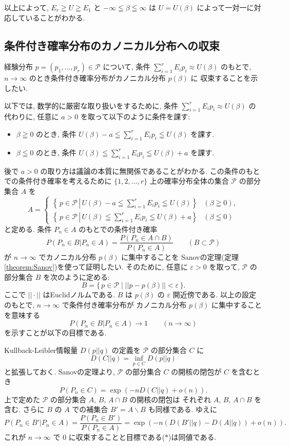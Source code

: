 \documentclass[12pt,twoside]{jarticle}
\newcommand\eps{\varepsilon}
\renewcommand\setminus{\smallsetminus}
\newcommand\cP{{\mathcal P}}
\theoremstyle{jplain}
\theoremstyle{jplain}
\theoremstyle{jplain}
\numberwithin{theorem}{section}
\numberwithin{equation}{section}
\numberwithin{figure}{section}
\numberwithin{table}{section}
\newcommand\theoremref[1]{定理\ref{#1}}
\begin{document}
以上によって, $E_r\geqq U\geqq E_1$ と $-\infty\leqq\beta\leqq\infty$
は $U=U(\beta)$ によって一対一に対応していることがわかる.


\subsection{条件付き確率分布のカノニカル分布への収束}

経験分布 $p=(p_1,\ldots,p_r)\in\cP$ について,
条件 $\sum_{i=1}^r E_i p_i\approx U(\beta)$ のもとで,
$n\to\infty$ のとき条件付き確率分布がカノニカル分布 $p(\beta)$ に
収束することを示したい.

以下では, 数学的に厳密な取り扱いをするために,
条件 $\sum_{i=1}^r E_i p_i\approx U(\beta)$ の代わりに,
任意に $a>0$ を取って以下のように条件を課す:
\begin{itemize}
\item $\beta\geqq 0$ のとき, 条件 \(
\displaystyle
U(\beta)-a \leqq \sum_{i=1}^r E_i p_i \leqq U(\beta)
\) を課す.
\item $\beta\leqq 0$ のとき, 条件 \(
\displaystyle
U(\beta)\leqq \sum_{i=1}^r E_i p_i \leqq U(\beta)+a
\) を課す.
\end{itemize}
後で $a>0$ の取り方は議論の本質に無関係であることがわかる.
この条件のもとでの条件付き確率を考えるために
$\{1,2,\ldots,r\}$ 上の確率分布全体の集合 $\cP$ の部分集合 $A$ を
\[
A =
\begin{cases}
\left\{\,p\in\cP \,\left|\,
U(\beta)-a \leqq \sum_{i=1}^r E_i p_i \leqq U(\beta) \right.\right\}
& (\beta\geqq 0),
\\
\left\{\, p\in\cP \,\left|\,
U(\beta)\leqq \sum_{i=1}^r E_i p_i \leqq U(\beta)+a \right.\right\}
& (\beta\leqq 0)
\end{cases}
\]
と定める. 条件 $P_n\in A$ のもとでの条件付き確率
\[
P(P_n\in B|P_n\in A)=\frac{P(P_n\in A\cap B)}{P(P_n\in A)}
\qquad (B\subset\cP)
\]
が $n\to\infty$ でカノニカル分布 $p(\beta)$ に集中することを
Sanovの定理(\theoremref{theorem:Sanov})を使って証明したい.
そのために, 任意に $\eps>0$ を取って,
$\cP$ の部分集合 $B$ を次のように定める:
\[
B = \{\,p\in\cP \mid ||p-p(\beta)||<\eps \,\}.
\]
ここで $||\cdot||$ はEuclidノルムである.
$B$ は $p(\beta)$ の $\eps$ 開近傍である.
以上の設定のもとで, $n\to\infty$ で条件付き確率分布が
カノニカル分布 $p(\beta)$ に集中することを意味する
\[
P(P_n\in B|P_n\in A)\to 1
\qquad (n\to\infty)
\tag{$*$}
\]
を示すことが以下の目標である.

Kullback-Leibler情報量 $D(p||q)$ の定義を $\cP$ の部分集合 $C$ に
\[
D(C||q) = \inf_{p\in C}D(p||q)
\]
と拡張しておく.
Sanovの定理より, $\cP$ の部分集合 $C$ の開核の閉包が $C$ を含むとき
\[
P(P_n\in C) = \exp(-n D(C||q) + o(n)).
\]
上で定めた $\cP$ の部分集合 $A$, $B$, $A\cap B$ の開核の閉包は
それぞれ $A$, $B$, $A\cap B$ を含む.
さらに $B$ の $A$ での補集合 $B'=A\setminus B$ も同様である.
ゆえに
\[
P(P_n\in B'|P_n\in A)
=\frac{P(P_n\in B')}{P(P_n\in A)}
=\exp(-n(D(B'||q)-D(A||q))+o(n)).
\]
これが $n\to\infty$ で $0$ に収束することと目標である($*$)は同値である.
\end{document}
